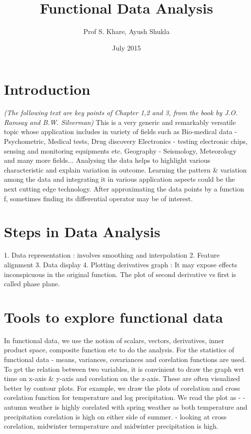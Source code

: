 \documentclass{article}
\title{Functional Data Analysis}
\author{Prof S. Khare, Ayush Shukla}
\date{July 2015}
\begin{document}
\maketitle

\section{Introduction}
\textit{(The following text are key points of Chapter 1,2 and 3, from the book by J.O. Ramsay and B.W. Silverman)}
This is a very generic and remarkably versatile topic whose application includes in variety of fields such as \newline Bio-medical data - Psychometric, Medical tests, Drug discovery \newline
Electronics - testing electronic chips, sensing and monitoring equipments etc. \newline
Geography - Seismology, Meteorology  \newline
and many more fields...\newline
Analysing the data helps to highlight various characteristic and explain variation in outcome. Learning the pattern \& variation among the data and integrating it in various application aspects could be the next cutting edge technology. \newline
After approximating the data points by a function f, sometimes finding its differential operator may be of interest.	
\section{Steps in Data Analysis}
1. Data representation : involves smoothing and interpolation
2. Feature alignment
3. Data display
4. Plotting derivatives graph : It may expose effects inconspicuous in the original function. The plot of second derivative vs first is called phase plane. 
\section{Tools to explore functional data}
In functional data, we use the notion of scalars, vectors, derivatives, inner product space, composite function etc to do the analysis. For the statistics of functional data - means, variances, covariances and corelation functions are used. To get the relation between two variables, it is convinient to draw the graph wrt time on x-axis \& y-axis and corelation on the z-axis. These are often visualized better by contour plots. For example, we draw the plots of corelation and cross corelation function for temperature and log precipitation. We read the plot as - \newline
- autumn weather is highly corelated with spring weather as both temperature and precipitation corelation is high on either side of summer.\newline 
- looking at cross corelation, midwinter termperature and midwinter precipitation is high.
\end{document}
